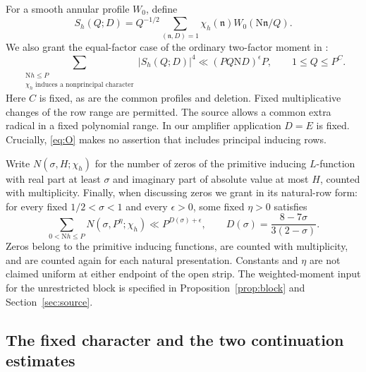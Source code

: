\documentclass[11pt]{article}
\theoremstyle{remark}\newtheorem{remark}[theorem]{Remark}
\newcommand{\N}{\mathrm N}
\begin{document}
For a smooth annular profile $W_0$, define
\begin{equation}
S_h(Q;D)=Q^{-1/2}\sum_{(\mathfrak n,D)=1}
\chi_h(\mathfrak n)W_0(\N\mathfrak n/Q).
\end{equation}
We also grant the equal-factor case of the ordinary two-factor moment in \citet[Theorem~1 and Section~2]{bt55v2}:
\begin{equation}
\sum_{\substack{\N h\le P\\\chi_h\text{ induces a nonprincipal character}}}
 |S_h(Q;D)|^4\ll(PQ\N D)^\epsilon P,
 \qquad 1\le Q\le P^C.
\tag{O}\label{eq:O}
\end{equation}
Here $C$ is fixed, as are the common profiles and deletion. Fixed multiplicative changes of the row range are permitted. The source allows a common extra radical in a fixed polynomial range. In our amplifier application $D=E$ is fixed. Crucially, \eqref{eq:O} makes no assertion that includes principal inducing rows.

Write $N(\sigma,H;\chi_h)$ for the number of zeros of the primitive inducing $L$-function with real part at least $\sigma$ and imaginary part of absolute value at most $H$, counted with multiplicity. Finally, when discussing zeros we grant \citet[Theorem~5.7]{bt52v5} in its natural-row form: for every fixed $1/2<\sigma<1$ and every $\epsilon>0$, some fixed $\eta>0$ satisfies
\begin{equation}
\sum_{0<\N h\le P}N(\sigma,P^\eta;\chi_h)
\ll P^{D(\sigma)+\epsilon},\qquad
D(\sigma)=\frac{8-7\sigma}{3(2-\sigma)}.
\tag{D}\label{eq:D}
\end{equation}
Zeros belong to the primitive inducing functions, are counted with multiplicity, and are counted again for each natural presentation. Constants and $\eta$ are not claimed uniform at either endpoint of the open strip. The weighted-moment input for the unrestricted block is specified in Proposition~\ref{prop:block} and Section~\ref{sec:source}.

\subsection{The fixed character and the two continuation estimates}
\end{document}
